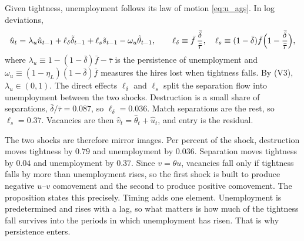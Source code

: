 \documentclass[authoryear, review, 12pt]{elsarticle}
\begin{document}
Given tightness, unemployment follows its law of motion \eqref{eq:u_ags}. In log deviations,
\begin{equation}\label{eq:u_fe}
	\hat{u}_t=\lambda_u\hat{u}_{t-1}+\ell_\delta\tilde\delta_{t-1}+\ell_s\tilde{s}_{t-1}-\omega_u\hat\theta_{t-1},
	\qquad
	\ell_\delta\equiv\bar{f}\,\frac{\bar\delta}{\bar\tau},\quad
	\ell_s\equiv(1-\bar\delta)\bar{f}\Bigl(1-\frac{\bar\delta}{\bar\tau}\Bigr),
\end{equation}
where $\lambda_u\equiv1-(1-\bar\delta)\bar{f}-\bar\tau$ is the persistence of unemployment
and $\omega_u\equiv(1-\eta_L)(1-\bar\delta)\bar{f}$ measures the hires lost when tightness
falls. By (V3), $\lambda_u\in(0,1)$. The direct
effects $\ell_\delta$ and $\ell_s$ split the separation flow into unemployment between the
two shocks. Destruction is a small share of separations, $\bar\delta/\bar\tau=0.087$, so
$\ell_\delta=0.036$. Match separations are the rest, so $\ell_s=0.37$. Vacancies are then
$\hat{v}_t=\hat\theta_t+\hat{u}_t$, and entry is the residual.

The two shocks are therefore mirror images. Per percent of the shock, destruction moves
tightness by $0.79$ and unemployment by $0.036$. Separation moves tightness by $0.04$ and
unemployment by $0.37$. Since $v=\theta u$, vacancies fall only if tightness falls by more
than unemployment rises, so the first shock is built to produce negative $u$--$v$
comovement and the second to produce positive comovement. The proposition states this
precisely. Timing adds one element. Unemployment is predetermined and rises with a lag, so
what matters is how much of the tightness fall survives into the periods in which
unemployment has risen. That is why persistence enters.
\end{document}
